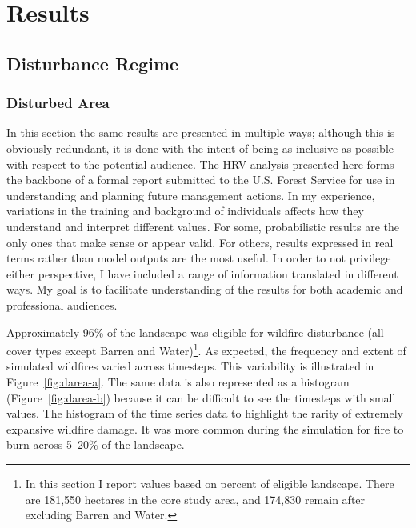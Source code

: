 \section{Results}
\label{sec:hrvresults}
\subsection{Disturbance Regime}

\subsubsection{Disturbed Area} 


In this section the same results are presented in multiple ways; although this is obviously redundant, it is done with the intent of being as inclusive as possible with respect to the potential audience. The HRV analysis presented here forms the backbone of a formal report submitted to the U.S. Forest Service for use in understanding and planning future management actions. In my experience, variations in the training and background of individuals affects how they understand and interpret different values. For some, probabilistic results are the only ones that make sense or appear valid. For others, results expressed in real terms rather than model outputs are the most useful. In order to not privilege either perspective, I have included a range of information translated in different ways. My goal is to facilitate understanding of the results for both academic and professional audiences.

Approximately 96\% of the landscape was eligible for wildfire disturbance (all cover types except Barren and Water)\footnote{In this section I report values based on percent of eligible landscape. There are 181,550 hectares in the core study area, and 174,830 remain after excluding Barren and Water.}. As expected, the frequency and extent of simulated wildfires varied across timesteps. This variability is illustrated in Figure~\ref{fig:darea-a}. The same data is also represented as a histogram (Figure~\ref{fig:darea-b}) because it can be difficult to see the timesteps with small values. The histogram of the time series data to highlight the rarity of extremely expansive wildfire damage. It was more common during the simulation for fire to burn across 5--20\% of the landscape.

